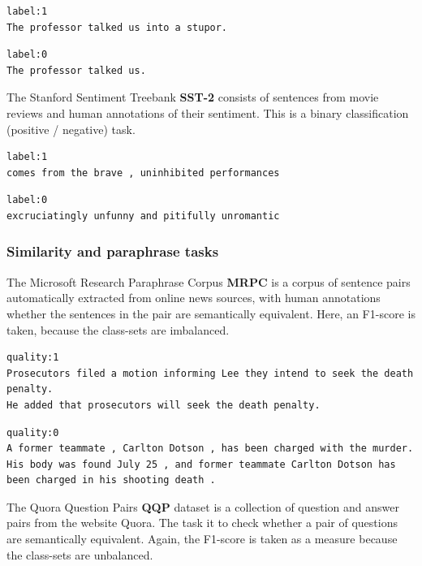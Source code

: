 \documentclass[a4paper,12pt,twoside,openright]{report}
\begin{document}
\begin{verbatim}
label:1
The professor talked us into a stupor.
\end{verbatim}

\begin{verbatim}
label:0	
The professor talked us.
\end{verbatim}

The Stanford Sentiment Treebank \textbf{SST-2} \cite{socher2013} consists of sentences from movie reviews and human annotations of their sentiment.
This is a binary classification (positive / negative) task.

\begin{verbatim}
label:1
comes from the brave , uninhibited performances
\end{verbatim}

\begin{verbatim}
label:0
excruciatingly unfunny and pitifully unromantic
\end{verbatim}

\subsubsection{Similarity and paraphrase tasks}

The Microsoft Research Paraphrase Corpus \textbf{MRPC} \cite{dolan2005} is a corpus of sentence pairs automatically extracted from online news sources, with human annotations whether the sentences in the pair are semantically equivalent.
Here, an F1-score is taken, because the class-sets are imbalanced.


\begin{verbatim}
quality:1	
Prosecutors filed a motion informing Lee they intend to seek the death penalty.	
He added that prosecutors will seek the death penalty.
\end{verbatim}

\begin{verbatim}
quality:0	
A former teammate , Carlton Dotson , has been charged with the murder.	
His body was found July 25 , and former teammate Carlton Dotson has been charged in his shooting death .
\end{verbatim}

The Quora Question Pairs \textbf{QQP} \cite{shankar17} dataset is a collection of question and answer pairs from the website Quora. 
The task it to check whether a pair of questions are semantically equivalent.
Again, the F1-score is taken as a measure because the class-sets are unbalanced.
\end{document}
